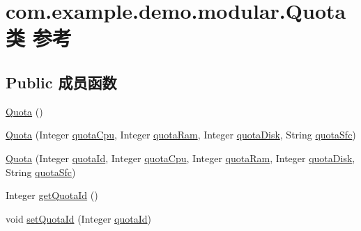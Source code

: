 \hypertarget{classcom_1_1example_1_1demo_1_1modular_1_1_quota}{}\section{com.\+example.\+demo.\+modular.\+Quota类 参考}
\label{classcom_1_1example_1_1demo_1_1modular_1_1_quota}
\subsection*{Public 成员函数}
\begin{DoxyCompactItemize}
\item 
\mbox{\hyperlink{classcom_1_1example_1_1demo_1_1modular_1_1_quota_a1ce4e6bd3f941226c0736c5fc9fab8a1}{Quota}} ()
\item 
\mbox{\hyperlink{classcom_1_1example_1_1demo_1_1modular_1_1_quota_ac05c1fda37d4bf2ad3d3608cf005221c}{Quota}} (Integer \mbox{\hyperlink{classcom_1_1example_1_1demo_1_1modular_1_1_quota_a428b51538960a749a252ed4606f6fc07}{quota\+Cpu}}, Integer \mbox{\hyperlink{classcom_1_1example_1_1demo_1_1modular_1_1_quota_a5e114f4238f35d989f3c462579f39428}{quota\+Ram}}, Integer \mbox{\hyperlink{classcom_1_1example_1_1demo_1_1modular_1_1_quota_a9a8b2cad8d2a7bc029339bf2f0ad1922}{quota\+Disk}}, String \mbox{\hyperlink{classcom_1_1example_1_1demo_1_1modular_1_1_quota_a63b24dc70969112269a9577fdd7dfb8e}{quota\+Sfc}})
\item 
\mbox{\hyperlink{classcom_1_1example_1_1demo_1_1modular_1_1_quota_a96761da72ee352248b7eb43f6b0204ae}{Quota}} (Integer \mbox{\hyperlink{classcom_1_1example_1_1demo_1_1modular_1_1_quota_a967956cd207b1a25008b8df8de611b20}{quota\+Id}}, Integer \mbox{\hyperlink{classcom_1_1example_1_1demo_1_1modular_1_1_quota_a428b51538960a749a252ed4606f6fc07}{quota\+Cpu}}, Integer \mbox{\hyperlink{classcom_1_1example_1_1demo_1_1modular_1_1_quota_a5e114f4238f35d989f3c462579f39428}{quota\+Ram}}, Integer \mbox{\hyperlink{classcom_1_1example_1_1demo_1_1modular_1_1_quota_a9a8b2cad8d2a7bc029339bf2f0ad1922}{quota\+Disk}}, String \mbox{\hyperlink{classcom_1_1example_1_1demo_1_1modular_1_1_quota_a63b24dc70969112269a9577fdd7dfb8e}{quota\+Sfc}})
\item 
Integer \mbox{\hyperlink{classcom_1_1example_1_1demo_1_1modular_1_1_quota_ab134f33e1ccbeffde46ec0b691718878}{get\+Quota\+Id}} ()
\item 
void \mbox{\hyperlink{classcom_1_1example_1_1demo_1_1modular_1_1_quota_ab5f53aa20399ed0c65697c0c92d0d1e0}{set\+Quota\+Id}} (Integer \mbox{\hyperlink{classcom_1_1example_1_1demo_1_1modular_1_1_quota_a967956cd207b1a25008b8df8de611b20}{quota\+Id}})

\end{DoxyCompactItemize}
